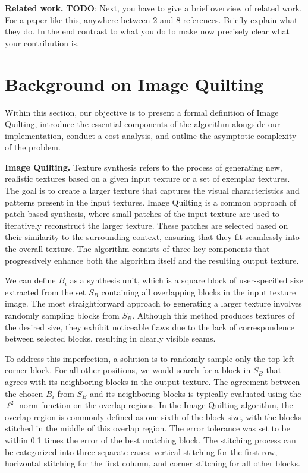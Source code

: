 \documentclass[letterpaper]{article}
\newcommand{\mypar}[1]{{\bf #1.}}
\begin{document}
\mypar{Related work} \textbf{TODO}: Next, you have to give a brief overview of
related work. For a paper like this, anywhere between 2 and 8
references. Briefly explain what they do. In the end contrast to what
you do to make now precisely clear what your contribution is.


\section{Background on Image Quilting}\label{sec:background}

Within this section, our objective is to present a formal definition of Image Quilting, introduce the essential components of the algorithm alongside our implementation, conduct a cost analysis, and outline the asymptotic complexity of the problem.

\mypar{Image Quilting}
Texture synthesis refers to the process of generating new, realistic textures based on a given input texture or a set of exemplar textures. The goal is to create a larger texture that captures the visual characteristics and patterns present in the input textures.
Image Quilting is a common approach of patch-based synthesis, where small patches of the input texture are used to iteratively reconstruct the larger texture. These patches are selected based on their similarity to the surrounding context, ensuring that they fit seamlessly into the overall texture. The algorithm consists of three key components that progressively enhance both the algorithm itself and the resulting output texture.

We can define \textit{$B_{i}$} as a synthesis unit, which is a square block of user-specified size extracted from the set \textit{$S_{B}$} containing all overlapping blocks in the input texture image. The most straightforward approach to generating a larger texture involves randomly sampling blocks from \textit{$S_{B}$}. Although this method produces textures of the desired size, they exhibit noticeable flaws due to the lack of correspondence between selected blocks, resulting in clearly visible seams.

To address this imperfection, a solution is to randomly sample only the top-left corner block. For all other positions, we would search for a block in \textit{$S_{B}$} that agrees with its neighboring blocks in the output texture. The agreement between the chosen \textit{$B_{i}$} from \textit{$S_{B}$} and its neighboring blocks is typically evaluated using the $\ell ^2$-norm function on the overlap regions. In the Image Quilting algorithm, the overlap region is commonly defined as one-sixth of the block size, with the blocks stitched in the middle of this overlap region. The error tolerance was set to be within 0.1 times the error of the best matching block. The stitching process can be categorized into three separate cases: vertical stitching for the first row, horizontal stitching for the first column, and corner stitching for all other blocks.
\end{document}

